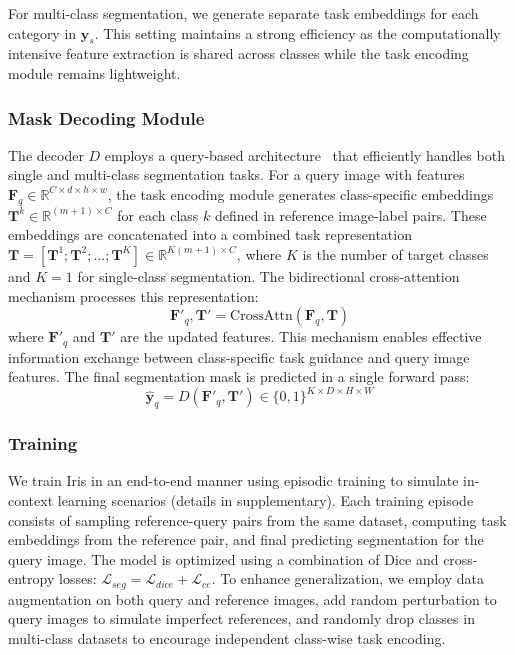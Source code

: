 For multi-class segmentation, we generate separate task embeddings for each category in $\boldsymbol{y}_s$. This setting maintains a strong efficiency as the computationally intensive feature extraction is shared across classes while the task encoding module remains lightweight.



\subsubsection{Mask Decoding Module}
The decoder $D$ employs a query-based architecture~\cite{cheng2022masked} that efficiently handles both single and multi-class segmentation tasks. For a query image with features $\boldsymbol{F}_q \in \mathbb{R}^{C \times d \times h \times w}$, the task encoding module generates class-specific embeddings $\boldsymbol{T}^k \in \mathbb{R}^{(m+1) \times C}$ for each class $k$ defined in reference image-label pairs. These embeddings are concatenated into a combined task representation $\boldsymbol{T} = [\boldsymbol{T}^1; \boldsymbol{T}^2; ...; \boldsymbol{T}^K] \in \mathbb{R}^{K(m+1) \times C}$, where $K$ is the number of target classes and $K=1$ for single-class segmentation. The bidirectional cross-attention mechanism processes this representation:
\begin{equation}
\boldsymbol{F}'_q, \boldsymbol{T}' = \text{CrossAttn}(\boldsymbol{F}_q, \boldsymbol{T})
\end{equation}
where $\boldsymbol{F}'_q$ and $\boldsymbol{T}'$ are the updated features. This mechanism enables effective information exchange between class-specific task guidance and query image features. The final segmentation mask is predicted in a single forward pass:
\begin{equation}
\boldsymbol{\hat{y}}_q = D(\boldsymbol{F}'_q, \boldsymbol{T}') \in \{0,1\}^{K \times D \times H \times W}
\end{equation}

\subsubsection{Training} We train Iris in an end-to-end manner using episodic training to simulate in-context learning scenarios (details in supplementary). Each training episode consists of sampling reference-query pairs from the same dataset, computing task embeddings from the reference pair, and final predicting segmentation for the query image. The model is optimized using a combination of Dice and cross-entropy losses: $\mathcal{L}_{seg} = \mathcal{L}_{dice} + \mathcal{L}_{ce}$. To enhance generalization, we employ data augmentation on both query and reference images, add random perturbation to query images to simulate imperfect references, and randomly drop classes in multi-class datasets to encourage independent class-wise task encoding.

